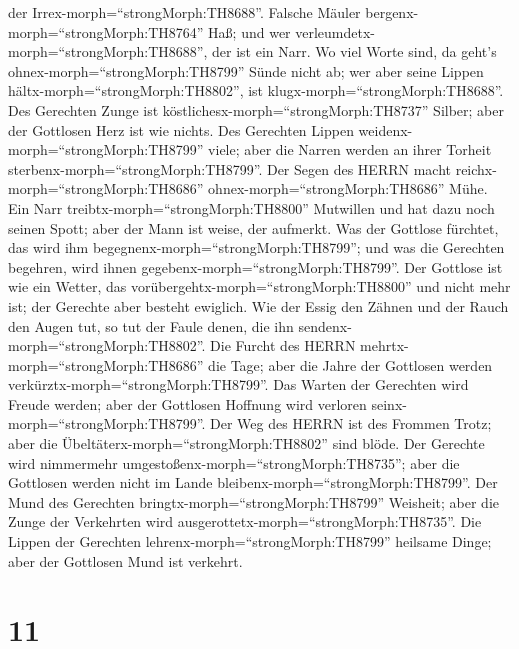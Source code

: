 der Irrex-morph=``strongMorph:TH8688''.  Falsche Mäuler
bergenx-morph=``strongMorph:TH8764'' Haß; und wer
verleumdetx-morph=``strongMorph:TH8688'', der ist ein Narr.
 Wo viel Worte sind, da geht's
ohnex-morph=``strongMorph:TH8799'' Sünde nicht ab; wer aber seine Lippen
hältx-morph=``strongMorph:TH8802'', ist
klugx-morph=``strongMorph:TH8688''.  Des Gerechten Zunge
ist köstlichesx-morph=``strongMorph:TH8737'' Silber; aber der Gottlosen
Herz ist wie nichts.  Des Gerechten Lippen
weidenx-morph=``strongMorph:TH8799'' viele; aber die Narren werden an
ihrer Torheit sterbenx-morph=``strongMorph:TH8799''.  Der
Segen des HERRN macht reichx-morph=``strongMorph:TH8686''
ohnex-morph=``strongMorph:TH8686'' Mühe.  Ein Narr
treibtx-morph=``strongMorph:TH8800'' Mutwillen und hat dazu noch seinen
Spott; aber der Mann ist weise, der aufmerkt.  Was der
Gottlose fürchtet, das wird ihm begegnenx-morph=``strongMorph:TH8799'';
und was die Gerechten begehren, wird ihnen
gegebenx-morph=``strongMorph:TH8799''.  Der Gottlose ist
wie ein Wetter, das vorübergehtx-morph=``strongMorph:TH8800'' und nicht
mehr ist; der Gerechte aber besteht ewiglich.  Wie der
Essig den Zähnen und der Rauch den Augen tut, so tut der Faule denen,
die ihn sendenx-morph=``strongMorph:TH8802''.  Die Furcht
des HERRN mehrtx-morph=``strongMorph:TH8686'' die Tage; aber die Jahre
der Gottlosen werden verkürztx-morph=``strongMorph:TH8799''.
 Das Warten der Gerechten wird Freude werden; aber der
Gottlosen Hoffnung wird verloren seinx-morph=``strongMorph:TH8799''.
 Der Weg des HERRN ist des Frommen Trotz; aber die
Übeltäterx-morph=``strongMorph:TH8802'' sind blöde.  Der
Gerechte wird nimmermehr umgestoßenx-morph=``strongMorph:TH8735''; aber
die Gottlosen werden nicht im Lande
bleibenx-morph=``strongMorph:TH8799''.  Der Mund des
Gerechten bringtx-morph=``strongMorph:TH8799'' Weisheit; aber die Zunge
der Verkehrten wird ausgerottetx-morph=``strongMorph:TH8735''.
 Die Lippen der Gerechten
lehrenx-morph=``strongMorph:TH8799'' heilsame Dinge; aber der Gottlosen
Mund ist verkehrt.

\hypertarget{section-10}{%
\section{11}\label{section-10}}

